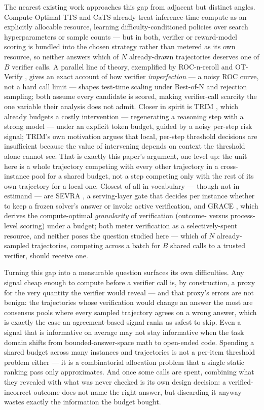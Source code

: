 \documentclass[11pt]{article}
\begin{document}
The nearest existing work approaches this gap from adjacent but distinct angles. Compute-Optimal-TTS \citep{ComputeOptTTS2607} and CaTS \citep{CaTS2607} already treat inference-time compute as an explicitly allocable resource, learning difficulty-conditioned policies over search hyperparameters or sample counts --- but in both, verifier or reward-model scoring is bundled into the chosen strategy rather than metered as its own resource, so neither answers which of $N$ already-drawn trajectories deserves one of $B$ verifier calls. A parallel line of theory, exemplified by ROC-n-reroll \citep{ROCnReroll2607} and OT-Verify \citep{OTVerify2607}, gives an exact account of how verifier \emph{imperfection} --- a noisy ROC curve, not a hard call limit --- shapes test-time scaling under Best-of-N and rejection sampling; both assume every candidate is scored, making verifier-call scarcity the one variable their analysis does not admit. Closer in spirit is TRIM \citep{TRIM2607}, which already budgets a costly intervention --- regenerating a reasoning step with a strong model --- under an explicit token budget, guided by a noisy per-step risk signal; TRIM's own motivation argues that local, per-step threshold decisions are insufficient because the value of intervening depends on context the threshold alone cannot see. That is exactly this paper's argument, one level up: the unit here is a whole trajectory competing with every other trajectory in a cross-instance pool for a shared budget, not a step competing only with the rest of its own trajectory for a local one. Closest of all in vocabulary --- though not in estimand --- are SEVRA \citep{SEVRA2026}, a serving-layer gate that decides per instance whether to keep a frozen solver's answer or invoke active verification, and GRACE \citep{GRACE2026}, which derives the compute-optimal \emph{granularity} of verification (outcome- versus process-level scoring) under a budget; both meter verification as a selectively-spent resource, and neither poses the question studied here --- which of $N$ already-sampled trajectories, competing across a batch for $B$ shared calls to a trusted verifier, should receive one.

Turning this gap into a measurable question surfaces its own difficulties. Any signal cheap enough to compute before a verifier call is, by construction, a proxy for the very quantity the verifier would reveal --- and that proxy's errors are not benign: the trajectories whose verification would change an answer the most are consensus pools where every sampled trajectory agrees on a wrong answer, which is exactly the case an agreement-based signal ranks as safest to skip. Even a signal that is informative on average may not stay informative when the task domain shifts from bounded-answer-space math to open-ended code. Spending a shared budget across many instances and trajectories is not a per-item threshold problem either --- it is a combinatorial allocation problem that a single static ranking pass only approximates. And once some calls are spent, combining what they revealed with what was never checked is its own design decision: a verified-incorrect outcome does not name the right answer, but discarding it anyway wastes exactly the information the budget bought.
\end{document}
